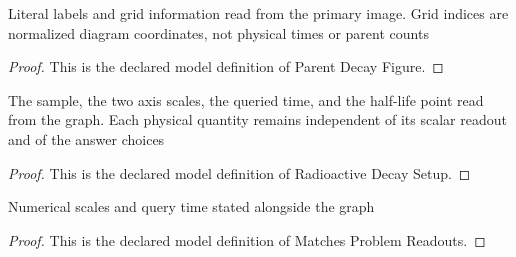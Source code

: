 \begin{definition}
  \label{def:physics:phyx-mini-0576:phyxminiproblems-problemphyxmini0576-parentdecayfigure}
  Literal labels and grid information read from the primary image. Grid indices are normalized diagram coordinates, not physical times or parent counts
\end{definition}
\begin{proof}
  This is the declared model definition of Parent Decay Figure.
\end{proof}
\begin{definition}
  \label{def:physics:phyx-mini-0576:phyxminiproblems-problemphyxmini0576-radioactivedecaysetup}
  The sample, the two axis scales, the queried time, and the half-life point read from the graph. Each physical quantity remains independent of its scalar readout and of the answer choices
\end{definition}
\begin{proof}
  This is the declared model definition of Radioactive Decay Setup.
\end{proof}
\begin{definition}
  \label{def:physics:phyx-mini-0576:phyxminiproblems-problemphyxmini0576-matchesproblemreadouts}
  Numerical scales and query time stated alongside the graph
\end{definition}
\begin{proof}
  This is the declared model definition of Matches Problem Readouts.
\end{proof}
